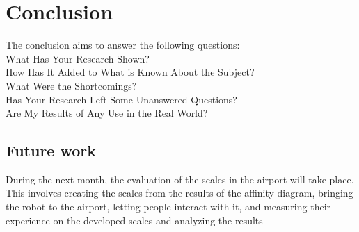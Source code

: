 \section{Conclusion}
\label{Conclusion}

The conclusion aims to answer the following questions: \\
What Has Your Research Shown?\\
How Has It Added to What is Known About the Subject?\\
What Were the Shortcomings?\\
Has Your Research Left Some Unanswered Questions?\\
Are My Results of Any Use in the Real World?

\subsection{Future work}
During the next month, the evaluation of the scales in the airport will take place. This involves creating the scales from the results of the affinity diagram, bringing the robot to the airport, letting people interact with it, and measuring their experience on the developed scales and analyzing the results